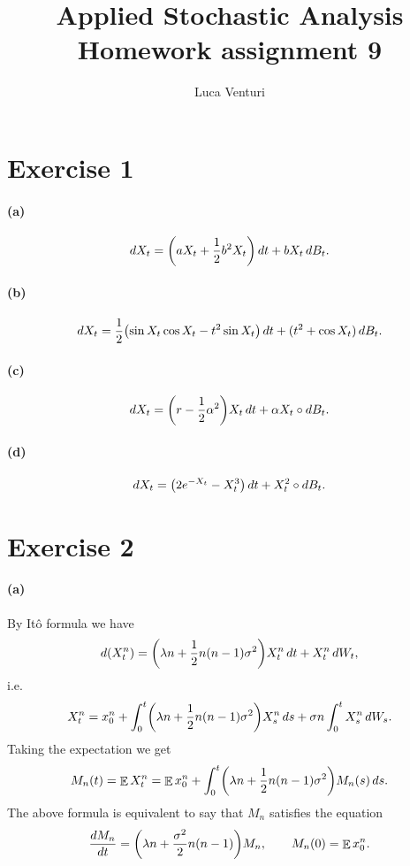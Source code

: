 \documentclass[a4paper,11pt]{article}
\theoremstyle{definition}
\theoremstyle{plain}
\theoremstyle{remark}
\DeclarePairedDelimiter{\parr}{(}{)}
\DeclareMathOperator*{\expval}{\mathbb{E}}
\begin{document}
\title{Applied Stochastic Analysis \\ Homework assignment 9}
\author{Luca Venturi}
\maketitle

\section*{Exercise 1}

\paragraph*{(a)}

$$
dX_t = \parr*{aX_t + \frac{1}{2}b^2X_t} \,dt + bX_t\,dB_t. 
$$

\paragraph*{(b)}

$$
dX_t = \frac{1}{2}\parr*{\sin X_t\cos X_t - t^2\sin X_t} \,dt + (t^2 + \cos X_t)\,dB_t. 
$$

\paragraph*{(c)}

$$
dX_t = \parr*{r-\frac{1}{2}\alpha^2}X_t\,dt + \alpha X_t\circ dB_t. 
$$

\paragraph*{(d)}

$$
dX_t = \parr*{2e^{-X_t} - X_t^3}\,dt + X_t^2\circ dB_t.
$$

\section*{Exercise 2}

\paragraph*{(a)}

By It\^o formula we have 
$$
d(X^n_t) = \parr*{\lambda n + \frac{1}{2}n(n-1)\sigma^2}X^n_t\,dt + X^n_t\,dW_t,
$$
i.e.
$$
X_t^n = x_0^n + \int_0^t \parr*{\lambda n  + \frac{1}{2}n(n-1)\sigma^2}X^n_s\,ds + \sigma n \int_0^t X^n_s\,dW_s.
$$
Taking the expectation we get
$$
M_n(t) = \expval X_t^n = \expval x_0^n + \int_0^t \parr*{\lambda n  + \frac{1}{2}n(n-1)\sigma^2}M_n(s)\,ds.
$$
The above formula is equivalent to say that $M_n$ satisfies the equation
$$
\frac{dM_n}{dt} = \parr*{\lambda n +\frac{\sigma^2}{2}n(n-1)}M_n, \qquad M_n(0) = \expval x_0^n.
$$
\end{document}
